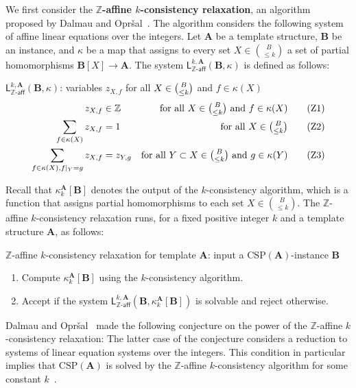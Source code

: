 \documentclass[a4paper,english, thm-restate]{lipics-v2021}
\newcommand{\ZZ}{\mathbb{Z}}
\newcommand{\defining}[1]{\textbf{#1}}
\newcommand{\StructA}{\mathbf{A}}
\newcommand{\StructB}{\mathbf{B}}
\newcommand{\CSP}[1]{\mathrm{CSP}(#1)}
\newcommand{\kcol}[3]{\kappa_{#1}^{#2}[#3]}
\newcommand{\restrict}[2]{#1|_{#2}}
\newcommand{\leqs}{\mathsf{L}}
\newcommand{\zafkleq}[4]{\leqs^{#1,#2}_{\ZZ\mathsf{\text{-}aff}}(#3,#4)}
\begin{document}
	
	We first consider the \defining{$\ZZ$-affine $k$-consistency relaxation},
	an algorithm proposed by Dalmau and Opr\v{s}al~\cite{DalmauOprsal2024}.
	The algorithm considers the following system of affine linear equations over the integers.
	Let $\StructA$ be a template structure, $\StructB$ be an instance,
	and $\kappa$ be a map
	that assigns to every set  $X \in \binom{B}{\leq k}$ a set of partial homomorphisms $\StructB[X] \to \StructA$.
	The system $\zafkleq{k}{\StructA}{\StructB}{\kappa}$
	is defined as follows: 
	
	\begin{systembox}{$\zafkleq{k}{\StructA}{\StructB}{\kappa}$: variables $z_{X,f}$
			for all $X \in {\tbinom{B} {\leq k}}$
			and $f \in \kappa(X)$}
		\begin{align*}
			z_{X,f} &\in \ZZ &  \text{for all } X \in \tbinom{B}{\leq k} \text { and } f \in \kappa(X)\tag{Z1}\\
			\sum_{f \in \kappa(X)}  z_{X,f}&= 1 &  \text{for all } X \in \tbinom{B}{\leq k}\label{eqn:zaff-sum-to-one}\tag{Z2}\\
			\sum_{f \in \kappa(X), \restrict{f}{Y} = g} z_{X,f} &= z_{Y,g} & \text{for all } Y\subset X \in \tbinom{B}{\leq k} \text { and } g \in \kappa(Y) \label{eqn:zaff-agree}\tag{Z3}
		\end{align*}
	\end{systembox}
	
	\noindent Recall that $\kcol{k}{\StructA}{\StructB}$ denotes the output of the $k$-consistency algorithm,
	which is a function that  assigns partial homomorphisms to each set $X \in \binom{B}{\leq k}$.
	The $\ZZ$-affine $k$-consistency relaxation runs, for a fixed positive integer $k$ and a template structure $\StructA$, as follows:
	\begin{algobox}{$\ZZ$-affine $k$-consistency relaxation for template $\StructA$: input a $\CSP{\StructA}$-instance $\StructB$}
		\begin{enumerate}
			\item Compute $\kcol{k}{\StructA}{\StructB}$ using the $k$-consistency algorithm.
			\item Accept if the system $\zafkleq{k}{\StructA}{\StructB}{\kcol{k}{\StructA}{\StructB}}$ is solvable and reject otherwise.
		\end{enumerate}
	\end{algobox}
	
	
	\noindent Dalmau and Opr\v{s}al~\cite{DalmauOprsal2024} made the following
	conjecture on the power of the $\ZZ$-affine $k$-consistency relaxation:
	\sthreeorZ*
	\noindent The latter case of the conjecture considers a reduction to systems of linear equation systems over the integers.
	This condition in particular implies
	that $\CSP{\StructA}$ is solved by the  $\ZZ$-affine $k$-consistency algorithm for some constant $k$~\cite{DalmauOprsal2024}.
	
\end{document}
